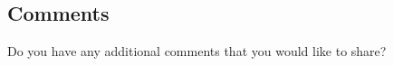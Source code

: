   \subsection{Comments}
    \noindent Do you have any additional comments that you would like to share? \hrulefill \\
    \parbox{\linewidth}{\hrulefill}
    \parbox{\linewidth}{\hrulefill}
    \parbox{\linewidth}{\hrulefill}
    \parbox{\linewidth}{\hrulefill}
    \parbox{\linewidth}{\hrulefill}
    \parbox{\linewidth}{\hrulefill}
    \parbox{\linewidth}{\hrulefill}
    \parbox{\linewidth}{\hrulefill}
    \parbox{\linewidth}{\hrulefill}
    \parbox{\linewidth}{\hrulefill}
    \parbox{\linewidth}{\hrulefill}
    \parbox{\linewidth}{\hrulefill}
    \parbox{\linewidth}{\hrulefill}